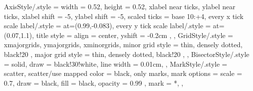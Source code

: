 \pgfplotsset
{
	AxisStyle/.style =
	{
		width					= 0.52\columnwidth,
		height					= 0.52\columnwidth,
		xlabel near ticks,
		ylabel near ticks,
		xlabel shift			= -5,
		ylabel shift			= -5,
		scaled ticks			= base 10:+4,
		every x tick scale label/.style = {at={(0.99,-0.083)}},
		every y tick scale label/.style = {at={(0.07,1.1)}},
		title style		=
		{
			align		= center,
			yshift		= -0.2cm
		},
	},
	GridStyle/.style =
	{
		xmajorgrids,
		ymajorgrids,
		xminorgrids,
		minor grid style =
		{
			thin,
			densely dotted,
			black!20
		},
		major grid style =
		{
			thin,
			densely dotted,
			black!20
		},
	},
	BisectorStyle/.style =
	{
		solid,
		draw			= black!30!white,
		line width		= 0.01cm,
	},
	MarkStyle/.style =
	{
		scatter,
		scatter/use mapped color = {black},
		only marks,
		mark options	=
		{
			scale 		= 0.7,
			draw		= black,
			fill		= black,
			opacity		= 0.99
		},
		mark			= *,
	},
}


